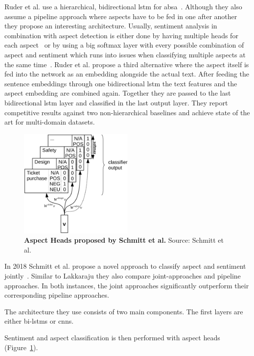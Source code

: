 Ruder et al. use a hierarchical, bidirectional \gls{lstm} for \gls{absa}~\cite{Ruder2016}. Although they also assume a pipeline approach where aspects have to be fed in one after another they propose an interesting architecture. Usually, sentiment analysis in combination with aspect detection is either done by having multiple heads for each aspect~\cite{Schmitt2018} or by using a big softmax layer with every possible combination of aspect and sentiment which runs into issues when classifying multiple aspects at the same time~\cite{Lakkaraju2014}. Ruder et al. propose a third alternative where the aspect itself is fed into the network as an embedding alongside the actual text. After feeding the sentence embeddings through one bidirectional \gls{lstm} the text features and the aspect embedding are combined again. Together they are passed to the last bidirectional \gls{lstm} layer and classified in the last output layer. They report competitive results against two non-hierarchical baselines and achieve state of the art for multi-domain datasets.
\medskip
\begin{figure}[htp]
    \centering
    \includegraphics[width=0.5\textwidth]{figures/02_relatedWork/02_jabsa}
    \caption{\textbf{Aspect Heads proposed by Schmitt et al.} Source: Schmitt et al.~\cite{Schmitt2018}}
    \label{fig:02_j-absa}
\end{figure}

In 2018 Schmitt et al. propose a novel approach to classify aspect and sentiment jointly~\cite{Schmitt2018}. Similar to Lakkaraju they also compare joint-approaches and pipeline approaches. In both instances, the joint approaches significantly outperform their corresponding pipeline approaches. 

The architecture they use consists of two main components. The first layers are either bi-\glspl{lstm} or \glspl{cnn}. 

Sentiment and aspect classification is then performed with aspect heads {(Figure~\ref{fig:02_j-absa})}. 


